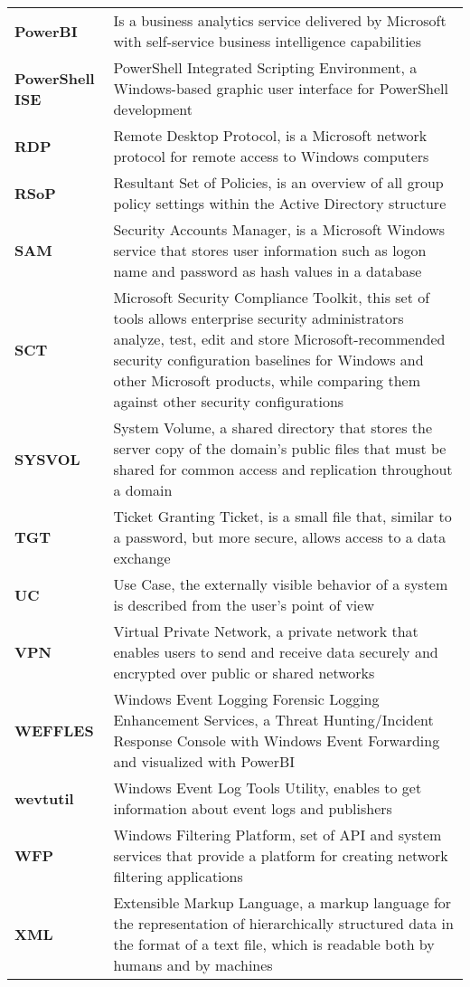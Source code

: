 \begin{longtable}{ p{4cm}  p{12cm} }
    \textbf{PowerBI} & Is a business analytics service delivered by Microsoft with self-service business intelligence capabilities\\
    \textbf{PowerShell ISE} & PowerShell Integrated Scripting Environment, a Windows-based graphic user interface for PowerShell development\\
    \textbf{RDP} & Remote Desktop Protocol, is a Microsoft network protocol for remote access to Windows computers\\
    \textbf{RSoP} & Resultant Set of Policies, is an overview of all group policy settings within the Active Directory structure\\
    \textbf{SAM} & Security Accounts Manager, is a Microsoft Windows service that stores user information such as logon name and password as hash values in a database\\
    \textbf{SCT} & Microsoft Security Compliance Toolkit, this set of tools allows enterprise security administrators analyze, test, edit and store Microsoft-recommended security configuration baselines for Windows and other Microsoft products, while comparing them against other security configurations\\
    \textbf{SYSVOL} & System Volume, a shared directory that stores the server copy of the domain's public files that must be shared for common access and replication throughout a domain\\
    \textbf{TGT} & Ticket Granting Ticket, is a small file that, similar to a password, but more secure, allows access to a data exchange\\
    \textbf{UC} & Use Case, the externally visible behavior of a system is described from the user's point of view\\
    \textbf{VPN} & Virtual Private Network, a private network that enables users to send and receive data securely and encrypted over public or shared networks\\
    \textbf{WEFFLES} & Windows Event Logging Forensic Logging Enhancement Services, a Threat Hunting/Incident Response Console with Windows Event Forwarding and visualized with PowerBI\\
    \textbf{wevtutil} & Windows Event Log Tools Utility, enables to get information about event logs and publishers\\
    \textbf{WFP} & Windows Filtering Platform,  set of API and system services that provide a platform for creating network filtering applications\\
    \textbf{XML} & Extensible Markup Language,  a markup language for the representation of hierarchically structured data in the format of a text file, which is readable both by humans and by machines\\
\end{longtable}